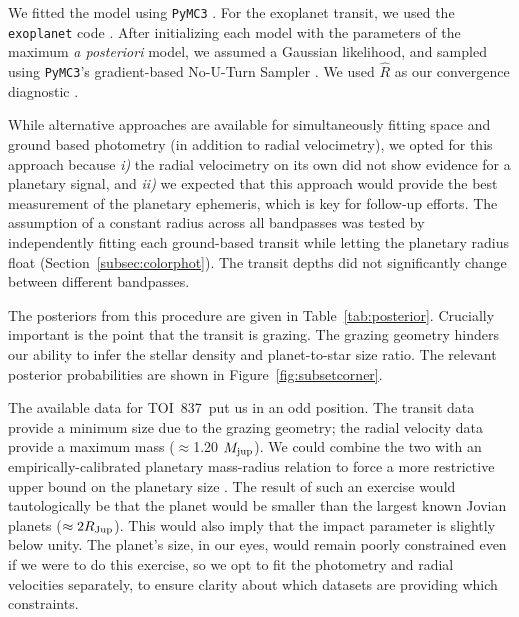 \documentclass[12pt,twocolumn,tighten]{aastex63}
\newcommand{\tn}{TOI~837} %
\begin{document}
We fitted the model using \texttt{PyMC3}
\citep{salvatier_2016_PyMC3,exoplanet:theano}. 
For the exoplanet transit, we used the \texttt{exoplanet} code
\citep{exoplanet:exoplanet}.  
After initializing each model with the parameters of the
maximum {\it a posteriori} model, we assumed a Gaussian
likelihood, and sampled using \texttt{PyMC3}'s gradient-based
No-U-Turn Sampler \citep{hoffman_no-u-turn_2014}. We used $\hat{R}$
as our convergence diagnostic \citep{gelman_inference_1992}.

While alternative approaches are available for simultaneously fitting
space and ground based photometry (in addition to radial velocimetry),
we opted for this approach because {\it i)} the radial velocimetry on
its own did not show evidence for a planetary signal, and {\it ii)} we
expected that this approach would provide the best measurement of the
planetary ephemeris, which is key for follow-up efforts.  The
assumption of a constant radius across all bandpasses was tested by
independently fitting each ground-based transit while letting the
planetary radius float (Section~\ref{subsec:colorphot}). The transit
depths did not significantly change between different bandpasses.

The posteriors from this procedure are given in
Table~\ref{tab:posterior}.  Crucially important is the point that the
transit is grazing.  The grazing geometry hinders our ability to infer
the stellar density and planet-to-star size ratio. The relevant
posterior probabilities are shown in Figure~\ref{fig:subsetcorner}.

The available data for \tn\ put us in an odd position. The transit
data provide a minimum size due to the grazing geometry; the radial
velocity data provide a maximum mass ($\approx$1.20 $M_{\rm jup}$).
We could combine the two with an empirically-calibrated planetary
mass-radius relation to force a more restrictive upper bound on the
planetary size \citep[{\it e.g.},][]{chen_probabilistic_2016}.  The
result of such an exercise would tautologically be that the planet
would be smaller than the largest known Jovian planets ($\approx
2R_{\rm Jup}$).  This would also imply that the impact parameter is
slightly below unity.  The planet's size, in our eyes, would remain
poorly constrained even if we were to do this exercise, so we opt to 
fit the photometry and radial velocities separately, to ensure clarity
about which datasets are providing which constraints.


\end{document}
